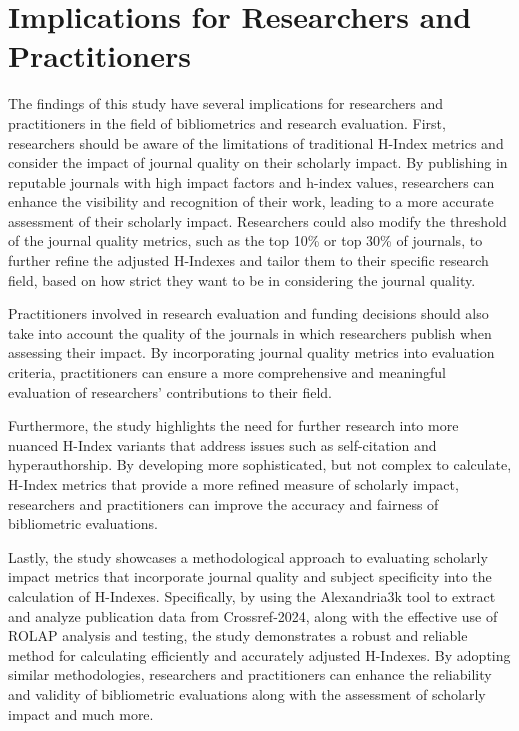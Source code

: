 \section{Implications for Researchers and Practitioners}

The findings of this study have several implications for researchers and
practitioners in the field of bibliometrics and research evaluation. First,
researchers should be aware of the limitations of traditional H-Index metrics
and consider the impact of journal quality on their scholarly impact. By
publishing in reputable journals with high impact factors and h-index values,
researchers can enhance the visibility and recognition of their work, leading
to a more accurate assessment of their scholarly impact. Researchers could also
modify the threshold of the journal quality metrics, such as the top 10\% or
top 30\% of journals, to further refine the adjusted H-Indexes and tailor them
to their specific research field, based on how strict they want to be in
considering the journal quality.

Practitioners involved in research evaluation and funding decisions should also
take into account the quality of the journals in which researchers publish when
assessing their impact. By incorporating journal quality metrics into
evaluation criteria, practitioners can ensure a more comprehensive and
meaningful evaluation of researchers' contributions to their field.

Furthermore, the study highlights the need for further research into more nuanced
H-Index variants that address issues such as self-citation and hyperauthorship.
By developing more sophisticated, but not complex to calculate, H-Index metrics
that provide a more refined measure of scholarly impact, researchers and
practitioners can improve the accuracy and fairness of bibliometric
evaluations.

Lastly, the study showcases a methodological approach to evaluating scholarly
impact metrics that incorporate journal quality and subject specificity into
the calculation of H-Indexes. Specifically, by using the Alexandria3k tool to
extract and analyze publication data from Crossref-2024, along with the
effective use of ROLAP analysis and testing, the study demonstrates a robust
and reliable method for calculating efficiently and accurately adjusted
H-Indexes. By adopting similar methodologies, researchers and practitioners can
enhance the reliability and validity of bibliometric evaluations along with the
assessment of scholarly impact and much more.


